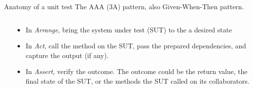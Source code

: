 \documentclass[english,10pt,aspectratio=169,t]{beamer}
\begin{document}
\begin{frame}{Anatomy of a unit test}
  The AAA (3A) pattern, also Given-When-Then pattern.

  \begin{columns}[T]
    \begin{column}[]{0.5\textwidth}
      \begin{minipage}{\linewidth}
        \aaapattern
      \end{minipage}
    \end{column}
    \begin{column}[]{0.5\textwidth}
      \begin{itemize}
        \item In \textit{Arrange}, bring the system under test (SUT) to the a
        desired state
        \item In \textit{Act}, call the method on the SUT, pass the prepared
        dependencies, and capture the output (if any).
        \item In \textit{Assert}, verify the outcome. The outcome could be the
        return value, the final state of the SUT, or the methods the SUT called
        on its collaborators.
      \end{itemize}
    \end{column}
  \end{columns}
\end{frame}
\end{document}
